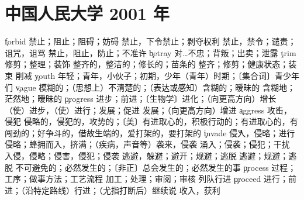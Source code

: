 \section{中国人民大学 2001 年}
\begin{multicols}{2}
\c{forbid}  \vt 禁止；阻止；阻碍；妨碍
  \vt 禁止，下令禁止；剥夺权利 \n 禁止，禁令；谴责；诅咒，诅骂
  \vt 禁止，阻止，防止；不准许
\c{betray}  \vt 对…不忠；背叛；出卖；泄露
\c{trim}  \vt 修剪；整理；装饰 \a 整齐的，整洁的；修长的；苗条的 \n 整齐；修剪；健康状态；装束 \vi 削减
\c{youth}  \n 年轻；青年，小伙子；初期，少年（青年）时期；〔集合词〕青少年们
\c{vague}  \a 模糊的；（思想上）不清楚的；（表达或感知）含糊的；暧昧的
  \ad 含糊地；茫然地；暧昧的
\c{progress}  \n 进步；前进；〔生物学〕进化；（向更高方向）增长 \v （使）进步，（使）进行；发展；促进 \vi 发展；（向更高方向）增进
\c{aggress}  \v 攻击，侵犯
  \a 侵略的，侵犯的，攻势的；〔美〕有进取心的，积极行动的；有进取心的，有闯劲的；好争斗的，借故生端的，爱打架的，要打架的
\c{invade}  \v 侵入，侵略；进行侵略；蜂拥而入，挤满；（疾病，声音等）袭来，侵袭 \vt 涌入；侵袭；侵犯；干扰
  \n 入侵，侵略；侵害，侵犯；侵袭
  \vt 逃避，躲避；避开；规避；逃脱 \vi 逃避；规避；逃脱
  \a 不可避免的；必然发生的；〔非正〕总会发生的；必然发生的事
\c{process}  \n 过程；工序；做事方法；工艺流程  \vt 加工；处理；审阅；审核 \vi 列队行进
\c{proceed}  \vi 进行；前进；（沿特定路线）行进；（尤指打断后）继续说 \n 收入，获利

\end{multicols}
